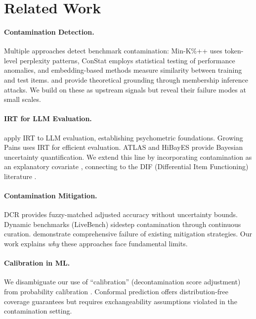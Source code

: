\documentclass[11pt,a4paper]{article}
\begin{document}
\section{Related Work}

\paragraph{Contamination Detection.} Multiple approaches detect benchmark contamination: Min-K\%++ \citep{shi2024detecting} uses token-level perplexity patterns, ConStat \citep{dekoninck2024constat} employs statistical testing of performance anomalies, and embedding-based methods measure similarity between training and test items. \citet{carlini2022quantifying} and \citet{shokri2017membership} provide theoretical grounding through membership inference attacks. We build on these as upstream signals but reveal their failure modes at small scales.

\paragraph{IRT for LLM Evaluation.} \citet{lalor2024benchmarking} apply IRT to LLM evaluation, establishing psychometric foundations. Growing Pains \citep{polo2024tinybenchmarks} uses IRT for efficient evaluation. ATLAS and HiBayES provide Bayesian uncertainty quantification. We extend this line by incorporating contamination as an explanatory covariate \citep{deboeck2004explanatory}, connecting to the DIF (Differential Item Functioning) literature \citep{holland1993differential,thissen1993detection}.

\paragraph{Contamination Mitigation.} DCR \citep{oren2024proving} provides fuzzy-matched adjusted accuracy without uncertainty bounds. Dynamic benchmarks (LiveBench) sidestep contamination through continuous curation. \citet{xu2025emperors} demonstrate comprehensive failure of existing mitigation strategies. Our work explains \emph{why} these approaches face fundamental limits.

\paragraph{Calibration in ML.} We disambiguate our use of ``calibration'' (decontamination score adjustment) from probability calibration \citep{guo2017calibration,platt1999probabilistic}. Conformal prediction \citep{angelopoulos2023conformal} offers distribution-free coverage guarantees but requires exchangeability assumptions violated in the contamination setting.
\end{document}
